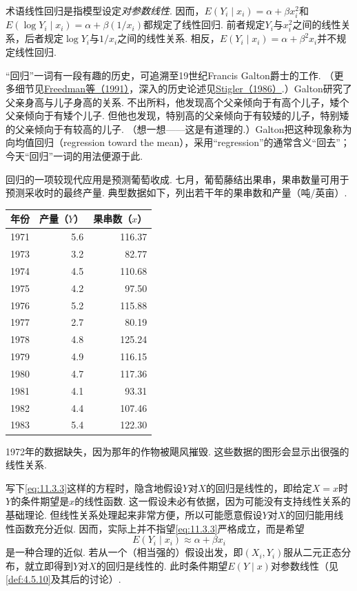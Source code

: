 术语线性回归是指模型设定\emph{对参数线性}. 因而，$E(Y_i\mid x_i)=\alpha+\beta x_i^2$和$E(\log Y_i\mid x_i)=\alpha+\beta(1/x_i)$都规定了线性回归. 前者规定$Y_i$与$x_i^2$之间的线性关系，后者规定$\log Y_i$与$1/x_i$之间的线性关系. 相反，$E(Y_i\mid x_i)=\alpha+\beta^2x_i$并不规定线性回归.

“回归”一词有一段有趣的历史，可追溯至19世纪Francis Galton爵士的工作. （更多细节见\hyperref[bib:source129]{Freedman等（1991）}，深入的历史论述见\hyperref[bib:source308]{Stigler（1986）}.）Galton研究了父亲身高与儿子身高的关系. 不出所料，他发现高个父亲倾向于有高个儿子，矮个父亲倾向于有矮个儿子. 但他也发现，特别高的父亲倾向于有较矮的儿子，特别矮的父亲倾向于有较高的儿子. （想一想——这是有道理的.）Galton把这种现象称为向均值回归（regression toward the mean），采用“regression”的通常含义“回去”；今天“回归”一词的用法便源于此.

\begin{example}[预测葡萄产量]\label{ex:11.3.1}
回归的一项较现代应用是预测葡萄收成. 七月，葡萄藤结出果串，果串数量可用于预测采收时的最终产量. 典型数据如下，列出若干年的果串数和产量（吨/英亩）.
\begin{center}
\begin{tabular}{rrr}
\toprule 年份&产量（$Y$）&果串数（$x$）\\\midrule
1971&5.6&116.37\\1973&3.2&82.77\\1974&4.5&110.68\\1975&4.2&97.50\\
1976&5.2&115.88\\1977&2.7&80.19\\1978&4.8&125.24\\1979&4.9&116.15\\
1980&4.7&117.36\\1981&4.1&93.31\\1982&4.4&107.46\\1983&5.4&122.30\\\bottomrule
\end{tabular}
\end{center}
1972年的数据缺失，因为那年的作物被飓风摧毁. 这些数据的图形会显示出很强的线性关系.
\end{example}

写下\eqref{eq:11.3.3}这样的方程时，隐含地假设$Y$对$X$的回归是线性的，即给定$X=x$时$Y$的条件期望是$x$的线性函数. 这一假设未必有依据，因为可能没有支持线性关系的基础理论. 但线性关系处理起来非常方便，所以可能愿意假设$Y$对$X$的回归能用线性函数充分近似. 因而，实际上并不指望\eqref{eq:11.3.3}严格成立，而是希望
\begin{equation}\label{eq:11.3.4}
E(Y_i\mid x_i)\approx\alpha+\beta x_i
\end{equation}
是一种合理的近似. 若从一个（相当强的）假设出发，即$(X_i,Y_i)$服从二元正态分布，就立即得到$Y$对$X$的回归是线性的. 此时条件期望$E(Y\mid x)$对参数线性（见\autoref{def:4.5.10}及其后的讨论）.

